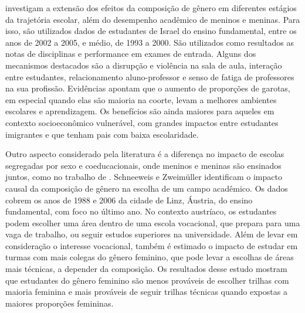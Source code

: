 \citet{Lavy2011} investigam a extensão dos efeitos da composição de gênero em diferentes estágios da trajetória escolar, além do desempenho acadêmico de meninos e meninas. Para isso, são utilizados dados de estudantes de Israel do ensino fundamental, entre os anos de 2002 a 2005, e médio, de 1993 a 2000. São utilizados como resultados as notas de disciplinas e performance em exames de entrada. Alguns dos mecanismos destacados são a disrupção e violência na sala de aula, interação entre estudantes, relacionamento aluno-professor e senso de fatiga de professores na sua profissão. Evidências apontam que o aumento de proporções de garotas, em especial quando elas são maioria na coorte, levam a melhores ambientes escolares e aprendizagem. Os benefícios são ainda maiores para aqueles em contexto socioeconômico vulnerável, com grandes impactos entre estudantes imigrantes e que tenham pais com baixa escolaridade.

Outro aspecto considerado pela literatura é a diferença no impacto de escolas segregadas por sexo e coeducacionais, onde meninos e meninas são ensinados juntos, como no  trabalho de \citet{Schneeweis2012}. Schneeweis e Zweimüller identificam o impacto causal da composição de gênero na escolha de um campo acadêmico. Os dados cobrem os anos de 1988 e 2006 da cidade de Linz, Áustria, do ensino fundamental, com foco no último ano. No contexto austríaco, os estudantes podem escolher uma área dentro de uma escola vocacional, que prepara para uma vaga de trabalho, ou seguir estudos superiores na universidade. Além de levar em consideração o interesse vocacional, também é estimado o impacto de estudar em turmas com mais colegas do gênero feminino, que pode levar a escolhas de áreas mais técnicas, a depender da composição. Os resultados desse estudo mostram que estudantes do gênero feminino são menos prováveis de escolher trilhas com maioria feminina e mais prováveis de seguir trilhas técnicas quando expostas a maiores proporções femininas.

